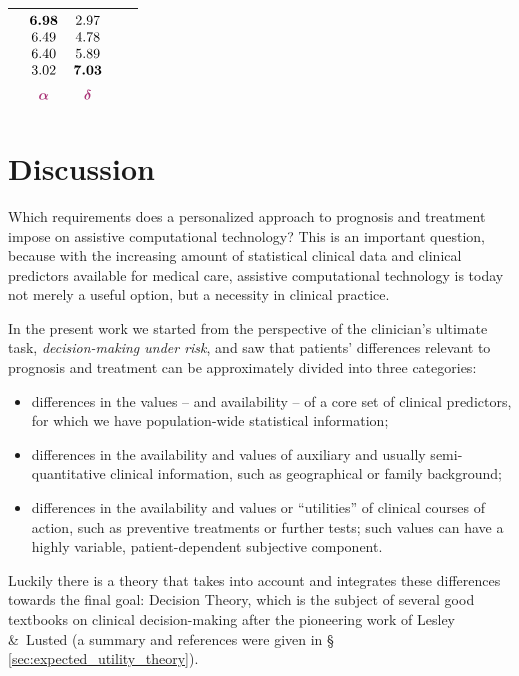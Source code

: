 \documentclass[utf8]{FrontiersinHarvard_mod} %
\newcommand*{\amp}{\&}
\newcommand*{\sect}{\S}%
\renewcommand*{\|}[1][]{\nonscript\:#1\vert\nonscript\:\mathopen{}}
\begin{document}
\begin{table}[b]
\begin{tabular}{lcccc}
    &
    $\begin{matrix}\bm{6.98}\\6.49\\6.40\\3.02\\[2\jot]\color{redpurple}\bm{\alpha}\end{matrix}$
    &
    $\begin{matrix}2.97\\4.78\\5.89\\\bm{7.03}\\[2\jot]\color{redpurple}\bm{\delta}\end{matrix}$
    \\[7\jot]
    \hline
  \end{tabular}
\end{table}



\bigskip%
\section{Discussion}
\label{sec:discussion}

Which requirements does a personalized approach to prognosis and treatment impose on assistive computational technology? This is an important question, because with the increasing amount of statistical clinical data and clinical predictors available for medical care, assistive computational technology is today not merely a useful option, but a necessity in clinical practice.

In the present work we started from the perspective of the clinician's ultimate task, \emph{decision-making under risk}, and saw that patients' differences relevant to prognosis and treatment can be approximately divided into three categories:
\begin{itemize}
\item\label{item:diff_corepredictors} differences in the values -- and availability -- of a core set of clinical predictors, for which we have population-wide statistical information;
\item\label{item:diff_priorinfo} differences in the availability and values of auxiliary and usually semi-quantitative clinical information, such as geographical or family background;
\item\label{item:diff_utility} differences in the availability and values or \enquote{utilities} of clinical courses of action, such as preventive treatments or further tests; such values can have a highly variable, patient-dependent subjective component.
\end{itemize}
Luckily there is a theory that takes into account and integrates these differences towards the final goal: Decision Theory, which is the subject of several good textbooks on clinical decision-making \citep{weinsteinetal1980,soxetal1988_r2013,huninketal2001_r2014} after the pioneering work of Lesley \amp\ Lusted \citeyearpar{ledleyetal1959,ledleyetal1959b,ledleyetal1960,lustedetal1960} (a summary and references were given in \sect\,\ref{sec:expected_utility_theory}).
\end{document}
